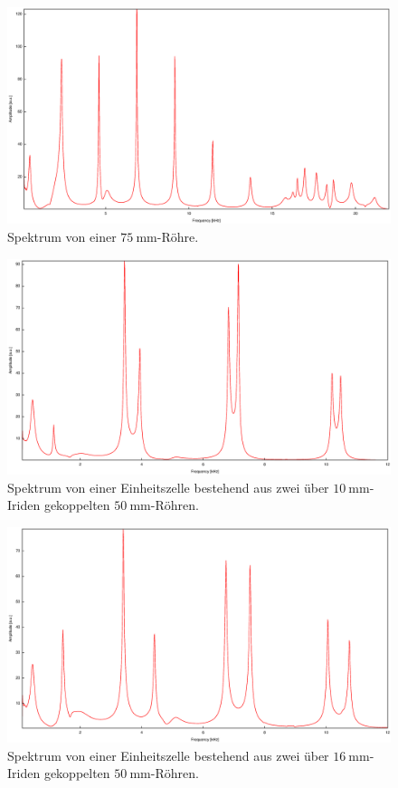 \begin{figure}
\centering
\includegraphics[width=\linewidth-60pt,height=\textheight-60pt,keepaspectratio]{FP-V23data/4.7_75mm.eps}
\caption{Spektrum von einer $\SI{75}{\milli\meter}$-Röhre.}
\label{fig:75mm}
\end{figure}

\begin{figure}
\centering
\includegraphics[width=\linewidth-60pt,height=\textheight-60pt,keepaspectratio]{FP-V23data/4.8_100mm_10mm.eps}
\caption{Spektrum von einer Einheitszelle bestehend aus zwei über $\SI{10}{\milli\meter}$-Iriden gekoppelten $\SI{50}{\milli\meter}$-Röhren.}
\label{fig:50_10_50}
\end{figure}

\begin{figure}
\centering
\includegraphics[width=\linewidth-60pt,height=\textheight-60pt,keepaspectratio]{FP-V23data/4.8_100mm_16mm.eps}
\caption{Spektrum von einer Einheitszelle bestehend aus zwei über $\SI{16}{\milli\meter}$-Iriden gekoppelten $\SI{50}{\milli\meter}$-Röhren.}
\label{fig:50_16_50}
\end{figure}


